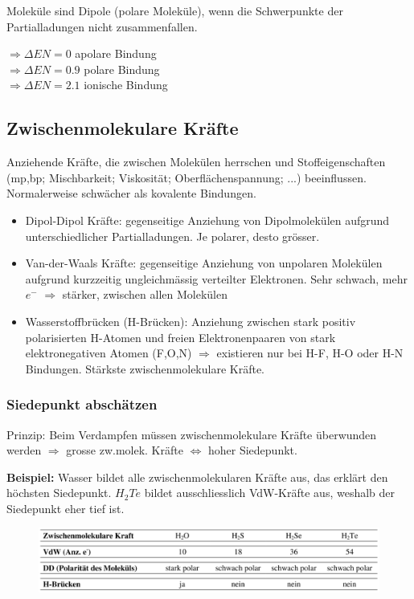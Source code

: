 Moleküle sind Dipole (polare Moleküle), wenn die Schwerpunkte der Partialladungen nicht zusammenfallen.

 $\Rightarrow \Delta EN=0$ apolare Bindung \\
 $\Rightarrow \Delta EN=0.9$ polare Bindung \\
 $\Rightarrow \Delta EN=2.1$ ionische Bindung 

\subsection{Zwischenmolekulare Kräfte}
Anziehende Kräfte, die zwischen Molekülen herrschen und Stoffeigenschaften (mp,bp; Mischbarkeit; Viskosität; Oberflächenspannung; ...) beeinflussen. Normalerweise schwächer als kovalente Bindungen.

\begin{itemize}
	\item Dipol-Dipol Kräfte: gegenseitige Anziehung von Dipolmolekülen aufgrund unterschiedlicher Partialladungen. Je polarer, desto grösser.
	\item Van-der-Waals Kräfte: gegenseitige Anziehung von unpolaren Molekülen aufgrund kurzzeitig ungleichmässig verteilter Elektronen. Sehr schwach, mehr $e^-$ $\Rightarrow$ stärker, zwischen allen Molekülen
	\item Wasserstoffbrücken (H-Brücken): Anziehung zwischen stark positiv polarisierten H-Atomen und freien Elektronenpaaren von stark elektronegativen Atomen (F,O,N) $\Rightarrow$ existieren nur bei H-F, H-O oder H-N Bindungen. Stärkste zwischenmolekulare Kräfte.
\end{itemize}

\subsubsection{Siedepunkt abschätzen}
Prinzip: Beim Verdampfen müssen zwischenmolekulare Kräfte überwunden werden $\Rightarrow$ grosse zw.molek. Kräfte $\Leftrightarrow$ hoher Siedepunkt. 

\textbf{Beispiel:} Wasser bildet alle zwischenmolekularen Kräfte aus, das erklärt den höchsten Siedepunkt. $H_2Te$ bildet ausschliesslich VdW-Kräfte aus, weshalb der Siedepunkt eher tief ist.
\begin{figure}[htbp]
	\centering
	\includegraphics[width=1\linewidth]{images/5_Siedepunkt.png}
\end{figure}


